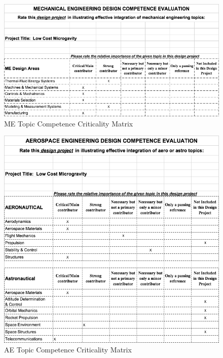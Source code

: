 \newpage
\begin{figure}[ht]
  \centering
  \includegraphics[width=1.0\textwidth]{Figures/Stupid2.png}
  \caption{\label{fig:Stupid2}ME Topic Competence Criticality Matrix}
\end{figure}

\newpage
\begin{figure}[ht]
  \centering
  \includegraphics[width=1.0\textwidth]{Figures/Stupid1.png}
  \caption{\label{fig:Stupid1}AE Topic Competence Criticality Matrix}
\end{figure}



